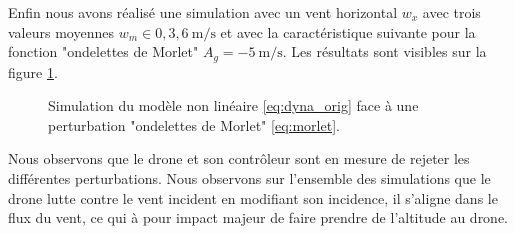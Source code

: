Enfin nous avons réalisé une simulation avec un vent horizontal $w_x$ avec trois valeurs moyennes $w_{m} \in {0,3,6}\SI{}{\meter\per\second}$ et avec la caractéristique suivante pour la fonction "ondelettes de Morlet" $A_g=\SI{-5}{\meter\per\second}$. Les résultats sont visibles sur la figure \ref{fig:sim_morlet}.

\begin{figure}[h]
    \centering
    \caption{Simulation du modèle non linéaire \eqref{eq:dyna_orig} face à une perturbation "ondelettes de Morlet" \eqref{eq:morlet}.}
    \label{fig:sim_morlet}
\end{figure}
Nous observons que le drone et son contrôleur sont en mesure de rejeter les différentes perturbations.
Nous observons sur l'ensemble des simulations que le drone lutte contre le vent incident en modifiant son incidence, il s'aligne dans le flux du vent, ce qui à pour impact majeur de faire prendre de l'altitude au drone.


